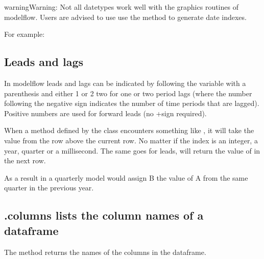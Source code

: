 \documentclass[letterpaper,10pt,english]{jupyterBook}
\begin{document}
\begin{sphinxadmonition}{warning}{Warning:}
\sphinxAtStartPar
Not all datetypes work well with the graphics routines of modelflow.  Users are advised to use use the  method to generate date indexes.

\sphinxAtStartPar
For example:

\begin{sphinxVerbatim}[commandchars=\\\{\}]
  
\end{sphinxVerbatim}
\end{sphinxadmonition}


\subsection{Leads and lags}
\label{\detokenize{content/04_PythonEssentials/PythonPandasDataframes:leads-and-lags}}
\sphinxAtStartPar
In modelflow leads and lags can be indicated by following the variable with a parenthesis and either \sphinxhyphen{}1 or \sphinxhyphen{}2 two for one or two period lags (where the number following the negative sign indicates the number of time periods that are lagged). Positive numbers are used for forward leads (no +sign required).

\sphinxAtStartPar
When a method defined by the  class encounters something like , it will take the value from the row above the current row. No matter if the index is an integer, a year, quarter or a millisecond. The same goes for leads,  will return the value of  in the next row.

\sphinxAtStartPar
As a result in a quarterly model  would assign B the value of A from the same quarter in the previous year.


\subsection{.columns lists the column names of a dataframe}
\label{\detokenize{content/04_PythonEssentials/PythonPandasDataframes:columns-lists-the-column-names-of-a-dataframe}}
\sphinxAtStartPar
The method  returns the names of the columns in the dataframe.
\end{document}
